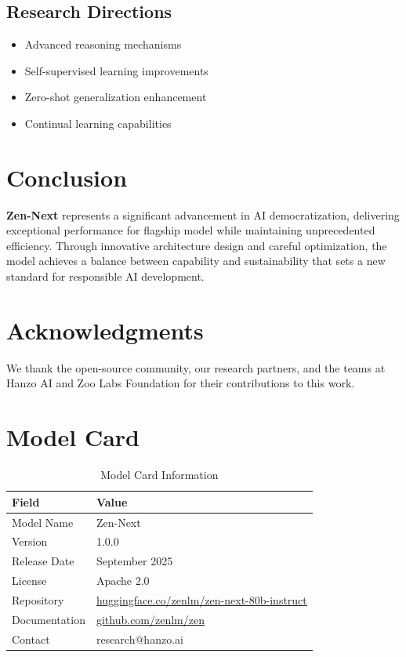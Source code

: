 \documentclass[11pt,a4paper]{article}
\begin{document}
\subsection{Research Directions}
\begin{itemize}
    \item Advanced reasoning mechanisms
    \item Self-supervised learning improvements
    \item Zero-shot generalization enhancement
    \item Continual learning capabilities
\end{itemize}

\section{Conclusion}

\textbf{Zen-Next} represents a significant advancement in AI democratization, 
delivering exceptional performance for flagship model while maintaining 
unprecedented efficiency. Through innovative architecture design and careful optimization, 
the model achieves a balance between capability and sustainability that sets a new standard 
for responsible AI development.

\section*{Acknowledgments}

We thank the open-source community, our research partners, and the teams at Hanzo AI and 
Zoo Labs Foundation for their contributions to this work.

\appendix

\section{Model Card}

\begin{table}[H]
\centering
\begin{tabular}{ll}
\toprule
\textbf{Field} & \textbf{Value} \\
\midrule
Model Name & Zen-Next \\
Version & 1.0.0 \\
Release Date & September 2025 \\
License & Apache 2.0 \\
Repository & \href{https://huggingface.co/zenlm/zen-next-80b-instruct}{huggingface.co/zenlm/zen-next-80b-instruct} \\
Documentation & \href{https://github.com/zenlm/zen}{github.com/zenlm/zen} \\
Contact & research@hanzo.ai \\
\bottomrule
\end{tabular}
\caption{Model Card Information}
\end{table}
\end{document}
